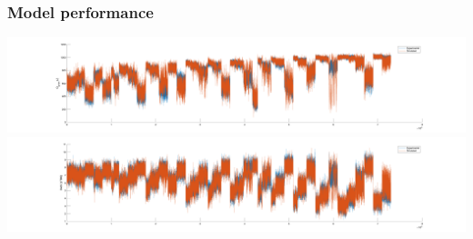 \documentclass[aspectratio=169, 10pt]{beamer}
\begin{document}
\begin{frame}
\frametitle{Model performance}
\begin{center}
\includegraphics[trim=175 0 175 0, clip, width=\textwidth]{../Model_Plots/Q_gross_comparison.png}
\includegraphics[trim=175 0 175 0, clip, width=\textwidth]{../Model_Plots/CA50_comparison.png}
\end{center}
\end{frame}
\end{document}
